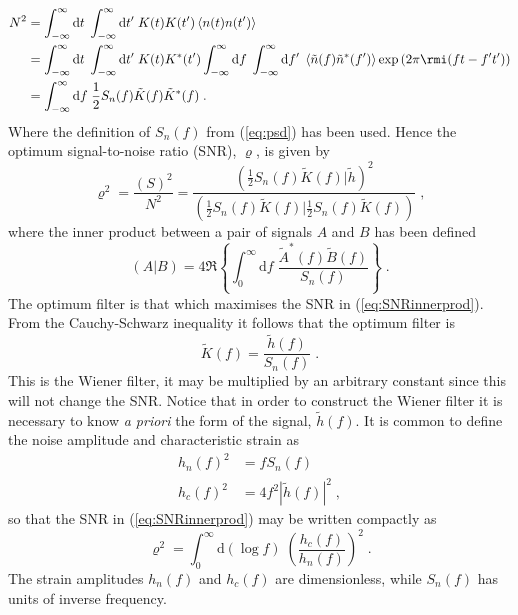 \begin{eqnarray} 
N^{2}&=\int_{-\infty}^{\infty}\textrm{d}t\;\int_{-\infty}^{\infty}\textrm{d}t'\;K(t)K(t')\left<n(t)n(t')\right> \nonumber \\
&=\int_{-\infty}^{\infty}\textrm{d}t\;\int_{-\infty}^{\infty}\textrm{d}t'\;K(t)K^{*}(t')\int_{-\infty}^{\infty}\textrm{d}f\;\int_{-\infty}^{\infty}\textrm{d}f'\;\left<\tilde{n}(f)\tilde{n}^{*}(f')\right>\exp\left(2\pi\rmi(ft-f't')\right)\nonumber \\
&=\int_{-\infty}^{\infty}\textrm{d}f \; \frac{1}{2}S_{n}(f)\tilde{K}(f)\tilde{K}^{*}(f) \; .
 \end{eqnarray}
Where the definition of $S_{n}(f)$ from (\ref{eq:psd}) has been used. Hence the optimum signal-to-noise ratio (SNR), $\varrho$, is given by
\begin{equation}\label{eq:SNRinnerprod} 
\varrho^{2}= \frac{(S)^{2}}{N^{2}}= \frac{\left( \frac{1}{2}S_{n}(f)\tilde{K}(f) \Big| \tilde{h} \right)^{2}}{\left( \frac{1}{2}S_{n}(f)\tilde{K}(f) \Big| \frac{1}{2}S_{n}(f)\tilde{K}(f) \right)} \;,
\end{equation}
where the inner product between a pair of signals $A$ and $B$ has been defined
\begin{equation}\label{eq:snrinnerprod} \left( A | B \right) = 4\Re\left\{\int_{0}^{\infty}\textrm{d}f\;\frac{\tilde{A}^{*}(f)\tilde{B}(f)}{S_{n}(f)}\right\} \; .\end{equation}
The optimum filter is that which maximises the SNR in (\ref{eq:SNRinnerprod}). From the Cauchy-Schwarz inequality it follows that the optimum filter is
\begin{equation} \tilde{K}(f)=\frac{\tilde{h}(f)}{S_{n}(f)} \; . \end{equation}
This is the Wiener filter, it may be multiplied by an arbitrary constant since this will not change the SNR. Notice that in order to construct the Wiener filter it is necessary to know \emph{a priori} the form of the signal, $\tilde{h}(f)$. It is common to define the noise amplitude and characteristic strain as
\begin{eqnarray}\label{eq:strains} h_{n}(f)^{2}&=fS_{n}(f) \\
\label{eq:strains1} \label{eq:strainsagain}               h_{c}(f)^{2}&=4f^{2}\left| \tilde{h}(f) \right|^{2} \; , \end{eqnarray}
so that the SNR in (\ref{eq:SNRinnerprod}) may be written compactly as
\begin{equation}\label{eq:hc} 
\varrho^{2}=\int_{0}^{\infty} \textrm{d}\left(\log f\right)\; \left(\frac{h_{c}(f)}{h_{n}(f)}\right)^{2} \;.
\end{equation}
The strain amplitudes $h_{n}(f)$ and $h_{c}(f)$ are dimensionless, while $S_{n}(f)$ has units of inverse frequency.

